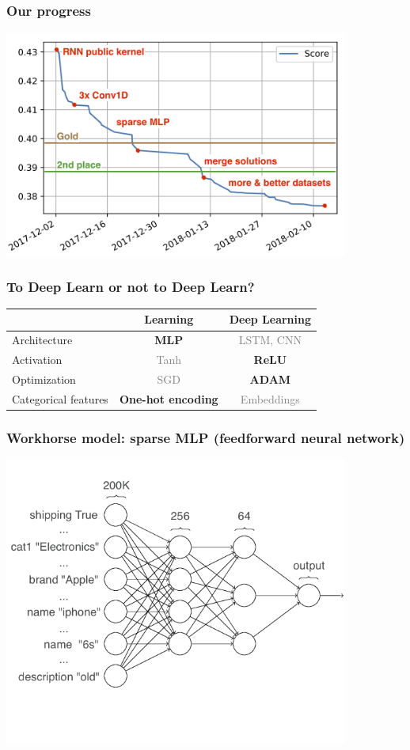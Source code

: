 \begin{frame}
\frametitle{Our progress}

\includegraphics[width=0.85\textwidth]{img/score-chart.png}

\end{frame}

\begin{frame}
\frametitle{To Deep Learn or not to Deep Learn?}

\begin{tabular}{ l | c c }
& Learning & Deep Learning \\
\hline
Architecture & \textbf{MLP} & \textcolor{gray}{LSTM, CNN} \\
Activation & \textcolor{gray}{Tanh} & \textbf{ReLU} \\
Optimization & \textcolor{gray}{SGD} & \textbf{ADAM} \\
Categorical features & \textbf{One-hot encoding} & \textcolor{gray}{Embeddings} \\
\end{tabular}

\end{frame}


\begin{frame}
    \frametitle{Workhorse model: sparse MLP (feedforward neural network)}

    \includegraphics[width=0.85\textwidth]{img/mlp.png}

\end{frame}

